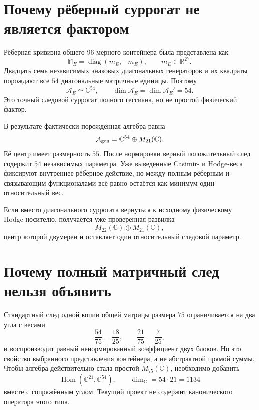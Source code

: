 \section{Почему рёберный суррогат не является фактором}

Рёберная кривизна общего 96-мерного контейнера была представлена как
\begin{equation}
 \mathbb M_E=\operatorname{diag}(m_E,-m_E),
 \qquad m_E\in\mathbb R^{27}.
\end{equation}
Двадцать семь независимых знаковых диагональных генераторов и их квадраты
порождают все $54$ диагональные матричные единицы. Поэтому
\begin{equation}
 \mathcal A_E\simeq\mathbb C^{54},
 \qquad
 \dim\mathcal A_E=\dim\mathcal A_E'=54.
 \label{eq:v7-support-edge-abelian-algebra}
\end{equation}
Это точный следовой суррогат полного гессиана, но не простой физический
фактор.

В результате фактически порождённая алгебра равна
\begin{equation}
 \mathcal A_{\rm gen}=\mathbb C^{54}\oplus M_{21}(\mathbb C).
 \label{eq:v7-support-generated-algebra}
\end{equation}
Её центр имеет размерность $55$. После нормировки верный положительный след
содержит $54$ независимых параметра. Уже выведенные Casimir- и
Hodge-веса фиксируют внутреннее рёберное действие, но между полным рёберным
и связывающим функционалами всё равно остаётся как минимум один
относительный вес.

Если вместо диагонального суррогата вернуться к исходному физическому
Hodge-носителю, получается уже проверенная развилка
\begin{equation}
 M_{22}(\mathbb C)\oplus M_{21}(\mathbb C),
 \label{eq:v7-support-physical-factor-fork}
\end{equation}
центр которой двумерен и оставляет один относительный следовой параметр.

\section{Почему полный матричный след нельзя объявить}

Стандартный след одной копии общей матрицы размера $75$ ограничивается на
два угла с весами
\begin{equation}
 \frac{54}{75}=\frac{18}{25},
 \qquad
 \frac{21}{75}=\frac7{25},
\end{equation}
и воспроизводит равный ненормированный коэффициент двух блоков. Но это
свойство выбранного представления контейнера, а не абстрактной прямой суммы.
Чтобы алгебра действительно стала простой $M_{75}(\mathbb C)$, необходимо
добавить
\begin{equation}
 \operatorname{Hom}(\mathbb C^{21},\mathbb C^{54}),
 \qquad \dim_{\mathbb C}=54\cdot21=1134
 \label{eq:v7-support-m75-connector-cost}
\end{equation}
вместе с сопряжённым углом. Текущий проект не содержит канонического
оператора этого типа.

